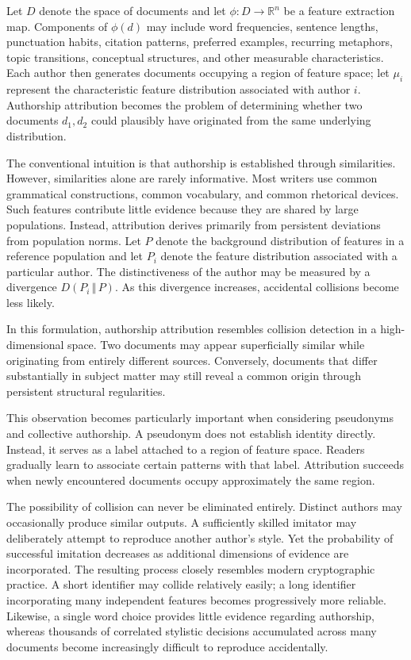 \documentclass[11pt]{article}
\theoremstyle{plain}
\begin{document}
Let $D$ denote the space of documents and let $\phi : D \rightarrow \mathbb{R}^n$ be a feature extraction map. Components of $\phi(d)$ may include word frequencies, sentence lengths, punctuation habits, citation patterns, preferred examples, recurring metaphors, topic transitions, conceptual structures, and other measurable characteristics. Each author then generates documents occupying a region of feature space; let $\mu_i$ represent the characteristic feature distribution associated with author $i$. Authorship attribution becomes the problem of determining whether two documents $d_1, d_2$ could plausibly have originated from the same underlying distribution.

The conventional intuition is that authorship is established through similarities. However, similarities alone are rarely informative. Most writers use common grammatical constructions, common vocabulary, and common rhetorical devices. Such features contribute little evidence because they are shared by large populations. Instead, attribution derives primarily from persistent deviations from population norms. Let $P$ denote the background distribution of features in a reference population and let $P_i$ denote the feature distribution associated with a particular author. The distinctiveness of the author may be measured by a divergence $D(P_i \,\Vert\, P)$. As this divergence increases, accidental collisions become less likely.

In this formulation, authorship attribution resembles collision detection in a high-dimensional space. Two documents may appear superficially similar while originating from entirely different sources. Conversely, documents that differ substantially in subject matter may still reveal a common origin through persistent structural regularities.

This observation becomes particularly important when considering pseudonyms and collective authorship. A pseudonym does not establish identity directly. Instead, it serves as a label attached to a region of feature space. Readers gradually learn to associate certain patterns with that label. Attribution succeeds when newly encountered documents occupy approximately the same region.

The possibility of collision can never be eliminated entirely. Distinct authors may occasionally produce similar outputs. A sufficiently skilled imitator may deliberately attempt to reproduce another author's style. Yet the probability of successful imitation decreases as additional dimensions of evidence are incorporated. The resulting process closely resembles modern cryptographic practice. A short identifier may collide relatively easily; a long identifier incorporating many independent features becomes progressively more reliable. Likewise, a single word choice provides little evidence regarding authorship, whereas thousands of correlated stylistic decisions accumulated across many documents become increasingly difficult to reproduce accidentally.
\end{document}
